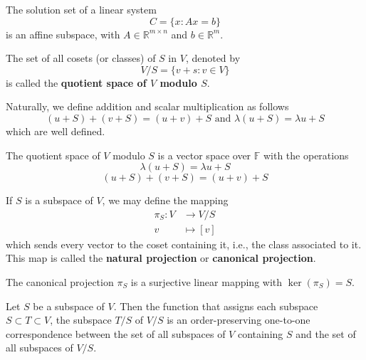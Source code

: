 \begin{example}
	The solution set of a linear system 
	\[
		C = \{ x : Ax = b \}
	\]
	is an affine subspace, with $A \in \mathbb{R}^{m \times n}$ and $b \in \mathbb{R}^m$.
\end{example}

\begin{definition}
	The set of all cosets (or classes) of $S$ in $V$, denoted by
\[
	V / S = \{ v+s : v \in V \}
\]
is called the \textbf{quotient space of $V$ modulo $S$}.
\end{definition}

Naturally, we define addition and scalar multiplication as follows
\[
	(u + S) + (v + S) = (u + v) + S \text{ and } \lambda(u+S) = \lambda u + S
\]
which are well defined.

\begin{theorem}
	The quotient space of $V$ modulo $S$ is a vector space over $\mathbb{F}$ with the operations
	\[
		\lambda(u + S) = \lambda u + S
	\]
	\[
		(u + S) + (v + S) = (u + v) + S
	\]
\end{theorem}

\begin{definition}
	If $S$ is a subspace of $V$, we may define the mapping 
	\begin{equation*}
		\begin{aligned}
			\pi_S : V &\longrightarrow V/S \\
			v &\longmapsto [v]
		\end{aligned}
	\end{equation*}
	which sends every vector to the coset containing it, i.e., the class associated to it. This map is called the \textbf{natural projection} or \textbf{canonical projection}.
\end{definition}

\begin{theorem}
	The canonical projection $\pi_S$ is a surjective linear mapping with $\ker (\pi_S) = S$.
\end{theorem}

\begin{theorem}
	Let $S$ be a subspace of $V$. Then the function that assigns each subspace $S \subset T \subset V$, the subspace $T/S$ of $V/S$ is an order-preserving one-to-one correspondence between the set of all subspaces of $V$ containing $S$ and the set of all subspaces of $V/S$.
\end{theorem}

